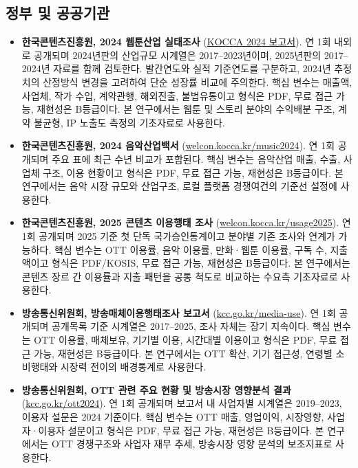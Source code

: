 \documentclass[11pt,a4paper]{report}
\begin{document}
\subsection{정부 및 공공기관}
\begin{itemize}[leftmargin=*, itemsep=0.6em]
  \item \textbf{한국콘텐츠진흥원, 2024 웹툰산업 실태조사} (\href{https://welcon.kocca.kr/ko/info/report/1954626}{KOCCA 2024 보고서}). 연 1회 내외로 공개되며 2024년판의 산업규모 시계열은 2017--2023년이며, 2025년판의 2017--2024년 자료를 함께 검토한다. 발간연도와 실적 기준연도를 구분하고, 2024년 추정치의 산정방식 변경을 고려하여 단순 성장률 비교에 주의한다. 핵심 변수는 매출액, 사업체, 작가 수입, 계약관행, 해외진출, 불법유통이고 형식은 PDF, 무료 접근 가능, 재현성은 B등급이다. 본 연구에서는 웹툰 및 스토리 분야의 수익배분 구조, 계약 불균형, IP 노출도 측정의 기초자료로 사용한다.
  \item \textbf{한국콘텐츠진흥원, 2024 음악산업백서} (\href{https://welcon.kocca.kr/ko/info/trend/1954309}{welcon.kocca.kr/music2024}). 연 1회 공개되며 주요 표에 최근 수년 비교가 포함된다. 핵심 변수는 음악산업 매출, 수출, 사업체 구조, 이용 현황이고 형식은 PDF, 무료 접근 가능, 재현성은 B등급이다. 본 연구에서는 음악 시장 규모와 산업구조, 로컬 플랫폼 경쟁여건의 기준선 설정에 사용한다.
  \item \textbf{한국콘텐츠진흥원, 2025 콘텐츠 이용행태 조사} (\href{https://welcon.kocca.kr/en/info/business/1956837}{welcon.kocca.kr/usage2025}). 연 1회 공개되며 2025 기준 첫 단독 국가승인통계이고 분야별 기존 조사와 연계가 가능하다. 핵심 변수는 OTT 이용률, 음악 이용률, 만화·웹툰 이용률, 구독 수, 지출액이고 형식은 PDF/KOSIS, 무료 접근 가능, 재현성은 B등급이다. 본 연구에서는 콘텐츠 장르 간 이용률과 지출 패턴을 공통 척도로 비교하는 수요측 기초자료로 사용한다.
  \item \textbf{방송통신위원회, 방송매체이용행태조사 보고서} (\href{https://www.kcc.go.kr/user.do?boardId=1027&dc=K02060100&page=A02060100&searchKey=ALL&searchVal=%EB%B0%A9%EC%86%A1%EB%A7%A4%EC%B2%B4}{kcc.go.kr/media-use}). 연 1회 공개되며 공개목록 기준 시계열은 2017--2025, 조사 자체는 장기 지속이다. 핵심 변수는 OTT 이용률, 매체보유, 기기별 이용, 시간대별 이용이고 형식은 PDF, 무료 접근 가능, 재현성은 B등급이다. 본 연구에서는 OTT 확산, 기기 접근성, 연령별 소비행태와 시장력 전이의 배경통계로 사용한다.
  \item \textbf{방송통신위원회, OTT 관련 주요 현황 및 방송시장 영향분석 결과} (\href{https://www.kcc.go.kr/download.do?fileSeq=60122}{kcc.go.kr/ott2024}). 연 1회 공개되며 보고서 내 사업자별 시계열은 2019--2023, 이용자 설문은 2024 기준이다. 핵심 변수는 OTT 매출, 영업이익, 시장영향, 사업자·이용자 설문이고 형식은 PDF, 무료 접근 가능, 재현성은 B등급이다. 본 연구에서는 OTT 경쟁구조와 사업자 재무 추세, 방송시장 영향 분석의 보조지표로 사용한다.

\end{itemize}
\end{document}
